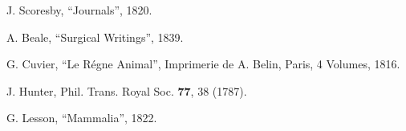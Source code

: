 

J. Scoresby, ``Journals'', 1820.

A. Beale, ``Surgical Writings'', 1839.


G. Cuvier, ``Le R\'egne Animal'', Imprimerie de A. Belin, Paris, 4 Volumes, 1816.


J. Hunter, Phil. Trans. Royal Soc. {\bf 77}, 38 (1787).


G. Lesson, ``Mammalia'',  1822.